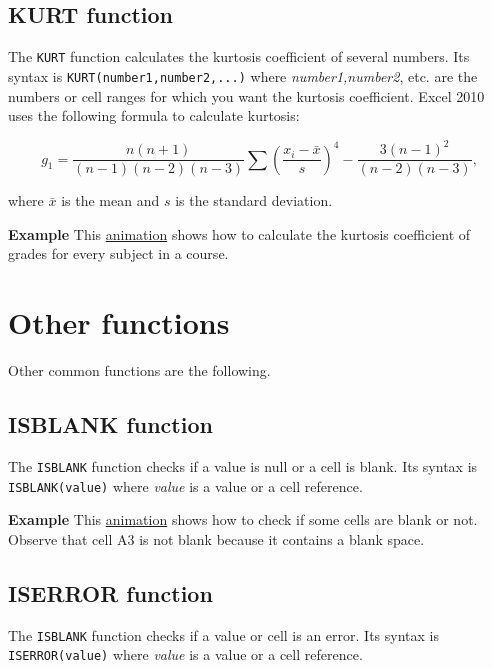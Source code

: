 \subsection{KURT function}\hypertarget{kurt-function}{}\label{kurt-function}

The \texttt{KURT} function calculates the kurtosis coefficient of several numbers. Its syntax is \texttt{KURT(number1,number2,...)} where \emph{number1,number2}, etc. are the numbers or cell ranges for which you want the kurtosis coefficient. Excel 2010 uses the following formula to calculate kurtosis:

\begin{displaymath}
g_1=\frac{n(n+1)}{(n-1)(n-2)(n-3)}\sum \left(\frac{x_i-\bar x}{s}\right)^4 - \frac{3(n-1)^2}{(n-2)(n-3)},
\end{displaymath}

where $\bar x$ is the mean and $s$ is the standard deviation.

\textbf{Example} This \href{http://aprendeconalf.es/office/excel/manual/img/example_function_kurt.gif}{animation} shows how to calculate the kurtosis coefficient of grades for every subject in a course.



\section{Other functions}\label{otherfunctions}
Other common functions are the following. 


\subsection{ISBLANK function}\label{isblankfunction}
The \texttt{ISBLANK} function checks if a value is null or a cell is blank. Its syntax is \texttt{ISBLANK(value)} where \emph{value} is a value or a cell reference. 

\textbf{Example} This \href{http://aprendeconalf.es/office/excel/manual/img/example_function_isblank.gif}{animation}
shows how to check if some cells are blank or not. Observe that cell A3 is not blank because it contains a blank space.


\subsection{ISERROR function}\label{iserrorfunction}
The \texttt{ISBLANK} function checks if a value or cell is an error. Its syntax is \texttt{ISERROR(value)} where \emph{value} is a value or a cell reference. 

